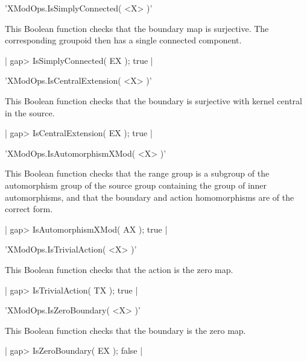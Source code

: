 %

'XModOps.IsSimplyConnected( <X> )'

This Boolean function checks that the boundary map is surjective.  The
corresponding groupoid then has a single connected component.

|    gap> IsSimplyConnected( EX );
    true |

%

'XModOps.IsCentralExtension( <X> )'

This  Boolean function checks  that the   boundary is surjective  with
kernel central in the source.

|    gap> IsCentralExtension( EX );
    true |

%

'XModOps.IsAutomorphismXMod( <X> )'

This Boolean function checks that the range group is a subgroup of the
automorphism group of  the source group  containing the group of inner
automorphisms,  and that the boundary and  action homomorphisms are of
the correct form.

|    gap> IsAutomorphismXMod( AX );
    true |

%

'XModOps.IsTrivialAction( <X> )'

This Boolean function checks that the action is the zero map.

|    gap> IsTrivialAction( TX );
    true |

%

'XModOps.IsZeroBoundary( <X> )'

This Boolean function checks that the boundary is the zero map.

|    gap> IsZeroBoundary( EX );
    false |

%

